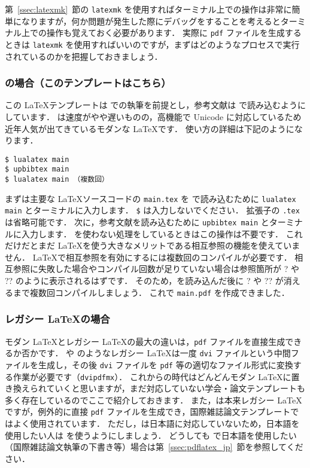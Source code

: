 第~\ref{ssec:latexmk}~節の \verb|latexmk| を使用すればターミナル上での操作は非常に簡単になりますが，何か問題が発生した際にデバッグをすることを考えるとターミナル上での操作も覚えておく必要があります．
実際に \verb|pdf| ファイルを生成するときは \verb|latexmk| を使用すればいいのですが，まずはどのようなプロセスで実行されているのかを把握しておきましょう．

\subsubsection*{\LuaLaTeX の場合（このテンプレートはこちら）}

この \LaTeX テンプレートは \LuaLaTeX での執筆を前提とし，参考文献は \upBibTeX で読み込むようにしています．
\LuaLaTeX は速度がやや遅いものの，高機能で Unicode に対応しているため近年人気が出てきているモダンな \LaTeX です．
使い方の詳細は下記のようになります．

\begin{tcolorbox}[title={\LuaLaTeX$+$\upBibTeX}, colback=red!5!white, colframe=red!75!black]
\begin{verbatim}
$ lualatex main
$ upbibtex main
$ lualatex main （複数回）
\end{verbatim}
\end{tcolorbox}

まずは主要な \LaTeX ソースコードの \verb|main.tex| を \LuaLaTeX で読み込むために \verb|lualatex main| とターミナルに入力します．
\verb|$| は入力しないでください．
拡張子の \verb|.tex| は省略可能です．
次に，参考文献を読み込むために \verb|upbibtex main| とターミナルに入力します．
\BibTeX を使わない処理をしているときはこの操作は不要です．
これだけだとまだ \LaTeX を使う大きなメリットである相互参照の機能を使えていません．
\LaTeX で相互参照を有効にするには複数回のコンパイルが必要です．
相互参照に失敗した場合やコンパイル回数が足りていない場合は参照箇所が ? や ?? のように表示されるはずです．
そのため，\upBibTeX を読み込んだ後に ? や ?? が消えるまで複数回コンパイルしましょう．
これで \verb|main.pdf| を作成できました．

\subsubsection*{レガシー \LaTeX の場合}

モダン \LaTeX とレガシー \LaTeX の最大の違いは，\verb|pdf| ファイルを直接生成できるか否かです．
\pLaTeX や \upLaTeX のようなレガシー \LaTeX は一度 \verb|dvi| ファイルという中間ファイルを生成し，その後 \verb|dvi| ファイルを \verb|pdf| 等の適切なファイル形式に変換する作業が必要です（\verb|dvipdfmx|）．
これからの時代はどんどんモダン \LaTeX に置き換えられていくと思いますが，まだ対応していない学会・論文テンプレートも多く存在しているのでここで紹介しておきます．
また，\pdfLaTeX は本来レガシー \LaTeX ですが，例外的に直接 \verb|pdf| ファイルを生成でき，国際雑誌論文テンプレートではよく使用されています．
ただし，\pdfLaTeX は日本語に対応していないため，日本語を使用したい人は \LuaLaTeX を使うようにしましょう．
どうしても \pdfLaTeX で日本語を使用したい（国際雑誌論文執筆の下書き等）場合は第~\ref{ssec:pdflatex_jp}~節を参照してください．

